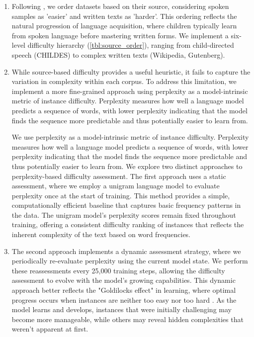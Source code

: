 \begin{enumerate}

    \item {} Following \citet{huebner2021babyberta}, we order datasets based on their source, considering spoken samples as 'easier' and written texts as 'harder'. This ordering reflects the natural progression of language acquisition, where children typically learn from spoken language before mastering written forms. We implement a six-level difficulty hierarchy (\cref{tbl:source_order}), ranging from child-directed speech (CHILDES) to complex written texts (Wikipedia, Gutenberg).

    \item {} While source-based difficulty provides a useful heuristic, it fails to capture the variation in complexity within each corpus. To address this limitation, we implement a more fine-grained approach using perplexity as a model-intrinsic metric of instance difficulty. Perplexity measures how well a language model predicts a sequence of words, with lower perplexity indicating that the model finds the sequence more predictable and thus potentially easier to learn from. 

    We use perplexity as a model-intrinsic metric of instance difficulty. Perplexity measures how well a language model predicts a sequence of words, with lower perplexity indicating that the model finds the sequence more predictable and thus potentially easier to learn from. We explore two distinct approaches to perplexity-based difficulty assessment. The first approach uses a static assessment, where we employ a unigram language model to evaluate perplexity once at the start of training. This method provides a simple, computationally efficient baseline that captures basic frequency patterns in the data. The unigram model's perplexity scores remain fixed throughout training, offering a consistent difficulty ranking of instances that reflects the inherent complexity of the text based on word frequencies.

    \item {} The second approach implements a dynamic assessment strategy, where we periodically re-evaluate perplexity using the current model state. We perform these reassessments every 25,000 training steps, allowing the difficulty assessment to evolve with the model's growing capabilities. This dynamic approach better reflects the "Goldilocks effect" in learning, where optimal progress occurs when instances are neither too easy nor too hard \cite{kidd2012goldilocks}. As the model learns and develops, instances that were initially challenging may become more manageable, while others may reveal hidden complexities that weren't apparent at first.


\end{enumerate}
